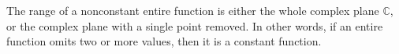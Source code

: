 \documentclass[12pt]{article}
\begin{document}
The range of a nonconstant entire function is either the whole complex plane $\mathbb{C}$, or the complex plane with a single point removed.
In other words, if an entire function omits two or more values, then it is a constant function.
\end{document}
